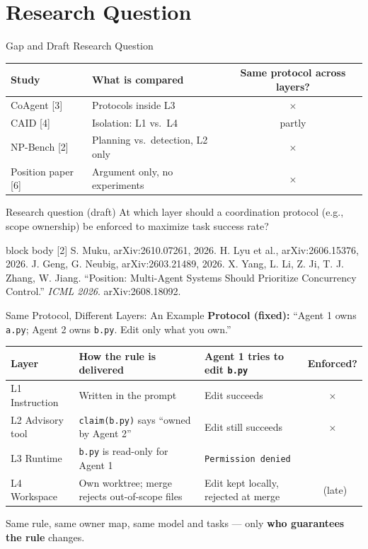 \documentclass[aspectratio=169,11pt]{beamer}
\newcommand{\papercite}[1]{%
  \vfill
  \begin{beamercolorbox}[wd=\textwidth,sep=3pt]{block body}
    \tiny #1
  \end{beamercolorbox}}
\newcommand{\yes}{\textcolor{green!50!black}{\checkmark}}
\newcommand{\no}{\textcolor{red!70!black}{$\times$}}
\begin{document}
\section{Research Question}
\begin{frame}{Gap and Draft Research Question}
  \small
  \begin{tabular}{l l c}
    \toprule
    Study & What is compared & Same protocol across layers? \\
    \midrule
    CoAgent [3] & Protocols inside L3 & \no \\
    CAID [4] & Isolation: L1 vs.\ L4 & partly \\
    NP-Bench [2] & Planning vs.\ detection, L2 only & \no \\
    Position paper [6] & Argument only, no experiments & \no \\
    \bottomrule
  \end{tabular}

  \vspace{1em}
  \begin{block}{Research question (draft)}
    At which layer should a coordination protocol (e.g., scope ownership) be enforced to maximize task success rate?
  \end{block}
  \papercite{[2] S. Muku, arXiv:2610.07261, 2026. \; [3] H. Lyu et al., arXiv:2606.15376, 2026. \; [4] J. Geng, G. Neubig, arXiv:2603.21489, 2026. \;
  [6] X. Yang, L. Li, Z. Ji, T. J. Zhang, W. Jiang. ``Position: Multi-Agent Systems Should Prioritize Concurrency Control.'' \textit{ICML 2026}. arXiv:2608.18092.}
\end{frame}

\begin{frame}{Same Protocol, Different Layers: An Example}
  \small\textbf{Protocol (fixed):} ``Agent 1 owns \texttt{a.py}; Agent 2 owns \texttt{b.py}. Edit only what you own.''\\[6pt]
  \centering
  \begin{tabularx}{\textwidth}{l X X c}
    \toprule
    Layer & How the rule is delivered & Agent 1 tries to edit \texttt{b.py} & Enforced? \\
    \midrule
    L1 Instruction & Written in the prompt & Edit succeeds & \no \\
    L2 Advisory tool & \texttt{claim(b.py)} says ``owned by Agent 2'' & Edit still succeeds & \no \\
    L3 Runtime & \texttt{b.py} is read-only for Agent 1 & \texttt{Permission denied} & \yes \\
    L4 Workspace & Own worktree; merge rejects out-of-scope files & Edit kept locally, rejected at merge & \yes~(late) \\
    \bottomrule
  \end{tabularx}

  \vspace{0.6em}
  \small Same rule, same owner map, same model and tasks --- only \textbf{who guarantees the rule} changes.
\end{frame}
\end{document}
